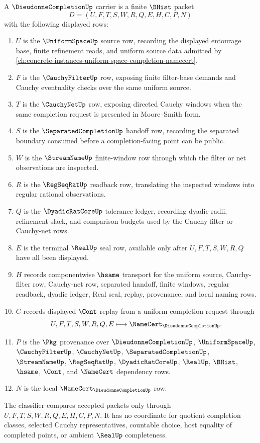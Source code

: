 \begin{definition}
\label{def:dieudonne-completion-carrier}
A $\DieudonneCompletionUp$ carrier is a finite $\BHist$ packet
$$
D=(U,F,T,S,W,R,Q,E,H,C,P,N)
$$
with the following displayed rows:
\begin{enumerate}
\item $U$ is the $\UniformSpaceUp$ source row, recording the displayed entourage base, finite refinement reads, and uniform source data admitted by \autoref{ch:concrete-instances-uniform-space-completion-namecert}.
\item $F$ is the $\CauchyFilterUp$ row, exposing finite filter-base demands and Cauchy eventuality checks over the same uniform source.
\item $T$ is the $\CauchyNetUp$ row, exposing directed Cauchy windows when the same completion request is presented in Moore--Smith form.
\item $S$ is the $\SeparatedCompletionUp$ handoff row, recording the separated boundary consumed before a completion-facing point can be public.
\item $W$ is the $\StreamNameUp$ finite-window row through which the filter or net observations are inspected.
\item $R$ is the $\RegSeqRatUp$ readback row, translating the inspected windows into regular rational observations.
\item $Q$ is the $\DyadicRatCoreUp$ tolerance ledger, recording dyadic radii, refinement slack, and comparison budgets used by the Cauchy-filter or Cauchy-net rows.
\item $E$ is the terminal $\RealUp$ seal row, available only after $U,F,T,S,W,R,Q$ have all been displayed.
\item $H$ records componentwise $\hsame$ transport for the uniform source, Cauchy-filter row, Cauchy-net row, separated handoff, finite windows, regular readback, dyadic ledger, Real seal, replay, provenance, and local naming rows.
\item $C$ records displayed $\Cont$ replay from a uniform-completion request through
$$
U,F,T,S,W,R,Q,E \longmapsto \NameCert_{\DieudonneCompletionUp}.
$$
\item $P$ is the $\Pkg$ provenance over $\DieudonneCompletionUp$, $\UniformSpaceUp$, $\CauchyFilterUp$, $\CauchyNetUp$, $\SeparatedCompletionUp$, $\StreamNameUp$, $\RegSeqRatUp$, $\DyadicRatCoreUp$, $\RealUp$, $\BHist$, $\hsame$, $\Cont$, and $\NameCert$ dependency rows.
\item $N$ is the local $\NameCert_{\DieudonneCompletionUp}$ row.
\end{enumerate}
The classifier compares accepted packets only through $U,F,T,S,W,R,Q,E,H,C,P,N$. It has no coordinate for quotient completion classes, selected Cauchy representatives, countable choice, host equality of completed points, or ambient $\RealUp$ completeness.
\end{definition}

